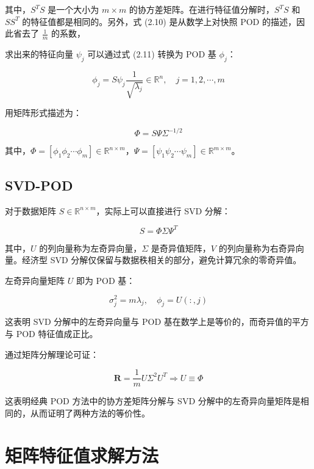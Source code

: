 其中，$S^T S$ 是一个大小为 $m \times m$ 的协方差矩阵。在进行特征值分解时，$S^T S$ 和 $S S^T$ 的特征值都是相同的。另外，式 (2.10) 是从数学上对快照 POD 的描述，因此省去了 $\frac{1}{m}$ 的系数，

求出来的特征向量 $\psi_j$ 可以通过式 (2.11) 转换为 POD 基 $\phi_j$：

\begin{equation}\phi_{j}=S\psi_{j}\frac{1}{\sqrt{\lambda_{j}}}\in\mathbb{R}^{n},\quad j=1,2,\cdots,m\end{equation}

用矩阵形式描述为：

\begin{equation}
\Phi = S \Psi \Sigma^{-1/2}
\end{equation}

其中，$\Phi = [\phi_1 \phi_2 \cdots \phi_m] \in \mathbb{R}^{n \times m}$，$\Psi = [\psi_1 \psi_2 \cdots \psi_m] \in \mathbb{R}^{m \times m}$。
\subsection{SVD-POD}
对于数据矩阵 $S \in \mathbb{R}^{n \times m}$，实际上可以直接进行 SVD 分解：

\begin{equation}
S = \Phi \Sigma \Psi^T
\end{equation}

其中，$U$ 的列向量称为左奇异向量，$\Sigma$ 是奇异值矩阵，$V$ 的列向量称为右奇异向量。经济型 SVD 分解仅保留与数据秩相关的部分，避免计算冗余的零奇异值。

左奇异向量矩阵 $U$ 即为 POD 基：

\begin{equation}
    \sigma_j^2 = m\lambda_j, \quad \phi_j = U(:,j)
    \label{eq:svd_relation}
\end{equation}

这表明 SVD 分解中的左奇异向量与 POD 基在数学上是等价的，而奇异值的平方与 POD 特征值成正比。

通过矩阵分解理论可证：

\begin{equation}
    \mathbf{R} = \frac{1}{m}U\Sigma^2 U^T \Rightarrow U \equiv \Phi
    \label{eq:equivalence_proof}
\end{equation}

这表明经典 POD 方法中的协方差矩阵分解与 SVD 分解中的左奇异向量矩阵是相同的，从而证明了两种方法的等价性。


\section{矩阵特征值求解方法}

